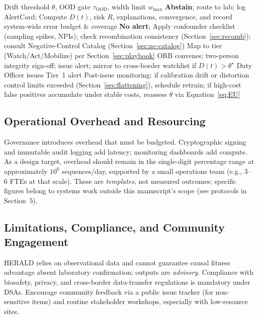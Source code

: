 \documentclass[11pt]{article}
\begin{document}
\begin{algorithm}[H]
\caption{Alert Governance Protocol (tiered with safety checks)}
\label{alg:governance}
\begin{algorithmic}[1]
\Require Drift threshold $\theta$, OOD gate $\tau_{\text{OOD}}$, width limit $w_{\max}$
 \State \textbf{Abstain}; route to lab; log AlertCard; \Return
\EndIf
\State Compute $D(t)$, risk $R$, explanations, convergence, and record system-wide error budget \& coverage
 \State \textbf{No alert}; \Return \EndIf
\State Apply confounder checklist (sampling spikes, NPIs); check recombination consistency (Section~\ref{sec:recomb}); consult Negative-Control Catalog (Section~\ref{sec:nc-catalog})
\State Map to tier (Watch/Act/Mobilize) per Section~\ref{sec:playbook}
 \State ORB convenes; two-person integrity sign-off; issue alert; mirror to cross-border watchlist if $D(t)>\theta^\star$
\Else \State Duty Officer issues Tier 1 alert
\EndIf
\State Post-issue monitoring: if calibration drift or distortion control limits exceeded (Section~\ref{sec:flattening}), schedule retrain; if high-cost false positives accumulate under stable costs, reassess $\theta$ via Equation~\eqref{eq:EU}
\end{algorithmic}
\end{algorithm}

\subsection{Operational Overhead and Resourcing}
\label{sec:overhead}
Governance introduces overhead that must be budgeted. Cryptographic signing and immutable audit logging add latency; monitoring dashboards add compute. As a design target, overhead should remain in the single-digit percentage range at approximately $10^6$ sequences/day, supported by a small operations team (e.g., 3--6 FTEs at that scale). These are \emph{templates}, not measured outcomes; specific figures belong to systems work outside this manuscript’s scope (see protocols in Section~5).

\subsection{Limitations, Compliance, and Community Engagement}
\label{sec:limits-ethics}
HERALD relies on observational data and cannot guarantee causal fitness advantage absent laboratory confirmation; outputs are \emph{advisory}. Compliance with biosafety, privacy, and cross-border data-transfer regulations is mandatory under DSAs. Encourage community feedback via a public issue tracker (for non-sensitive items) and routine stakeholder workshops, especially with low-resource sites.
\end{document}
